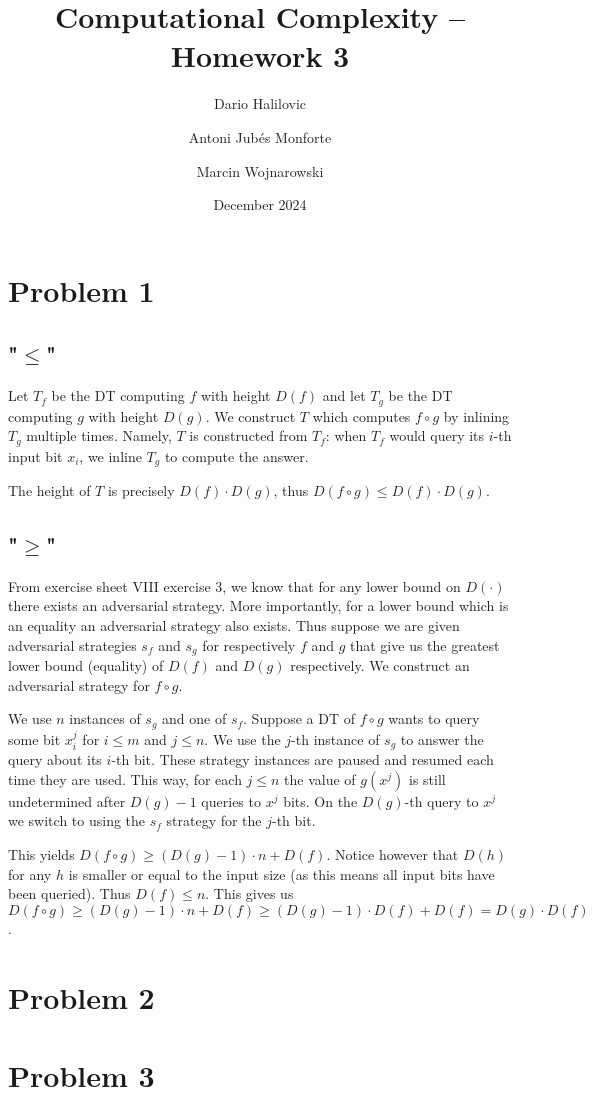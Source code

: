\documentclass{article}
\title{Computational Complexity -- Homework 3}
\author{Dario Halilovic\and
Antoni Jubés Monforte\and
Marcin Wojnarowski}
\date{December 2024}
\begin{document}
\maketitle

\section*{Problem 1}

\subsection*{"$\le$"}

Let $T_f$ be the DT computing $f$ with height $D(f)$ and let $T_g$ be the DT computing $g$ with height $D(g)$. We construct $T$ which computes $f \circ g$ by inlining $T_g$ multiple times. Namely, $T$ is constructed from $T_f$: when $T_f$ would query its $i$-th input bit $x_i$, we inline $T_g$ to compute the answer.

The height of $T$ is precisely $D(f) \cdot D(g)$, thus $D(f \circ g) \le D(f) \cdot D(g)$.

\subsection*{"$\ge$"}

From exercise sheet VIII exercise 3, we know that for any lower bound on $D(\cdot)$ there exists an adversarial strategy. More importantly, for a lower bound which is an equality an adversarial strategy also exists. Thus suppose we are given adversarial strategies $s_f$ and $s_g$ for respectively $f$ and $g$ that give us the greatest lower bound (equality) of $D(f)$ and $D(g)$ respectively. We construct an adversarial strategy for $f \circ g$.

We use $n$ instances of $s_g$ and one of $s_f$. Suppose a DT of $f \circ g$ wants to query some bit $x_i^j$ for $i \le m$ and $j \le n$. We use the $j$-th instance of $s_g$ to answer the query about its $i$-th bit. These strategy instances are paused and resumed each time they are used. This way, for each $j \le n$ the value of $g(x^j)$ is still undetermined after $D(g)-1$ queries to $x^j$ bits. On the $D(g)$-th query to $x^j$ we switch to using the $s_f$ strategy for the $j$-th bit.

This yields $D(f \circ g) \ge (D(g) - 1) \cdot n + D(f)$. Notice however that $D(h)$ for any $h$ is smaller or equal to the input size (as this means all input bits have been queried). Thus $D(f) \le n$. This gives us $D(f \circ g) \ge (D(g) - 1) \cdot n + D(f) \ge (D(g) - 1) \cdot D(f) + D(f) = D(g) \cdot D(f)$.

\section*{Problem 2}

\section*{Problem 3}
\end{document}
